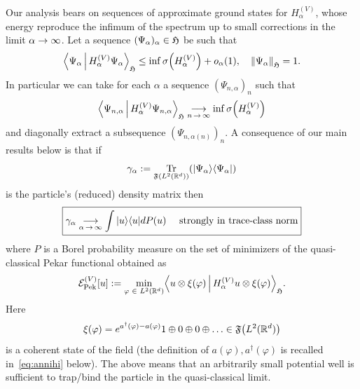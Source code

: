 \documentclass[10pt]{amsart}
\theoremstyle{definition}\newtheorem{defi}[theo]{Definition}\newtheorem{rema}[theo]{Remark}\newtheorem{exam}[theo]{Example}\newtheorem{exem}[theo]{Example}\newtheorem{nota}[theo]{Notation}
\DeclareMathOperator{\Tr}{Tr}
\newcommand{\R}{\mathbb{R}}
\newcommand{\gH}{\mathfrak{H}}
\newcommand{\gF}{\mathfrak{F}}
\newcommand{\cE}{\mathcal{E}}
\newcommand{\1}{\mathds{1}}
\newcommand{\cEP}{\cE_{\mathrm{Pek}}}
\let\oldin\in
\renewcommand{\in}{\mathchoice{\oldin}{\oldin}{\,\oldin\,}{\,\oldin\,}}
\renewcommand*{\to}{\mathchoice{\longrightarrow}{\rightarrow}{\rightarrow}{\rightarrow}}
\let\originalleft\left
\let\originalright\right
\renewcommand{\left}{\mathopen{}\mathclose\bgroup\originalleft}
\renewcommand{\right}{\aftergroup\egroup\originalright}
\begin{document}
Our analysis bears on sequences of approximate ground states for $H_\alpha^{(V)}$, whose energy reproduce the infimum of the spectrum up to small corrections in the limit $\alpha \to \infty$. Let a sequence $(\Psi_\alpha)_\alpha \in \gH$ be such that
\begin{equation}\label{eq:approx GS}
\left\langle \Psi_\alpha\, \middle|\, H_\alpha^{(V)} \Psi_\alpha\right\rangle_{\gH} \leq \inf \sigma \left(H_\alpha^{(V)}\right) +o_{\alpha} (1), \quad \left\|\Psi_\alpha \right\|_\gH = 1.
\end{equation}
In particular we can take for each $\alpha$ a sequence $(\Psi_{n,\alpha})_n$ such that
\begin{equation*}
\left\langle \Psi_{n,\alpha} \, \middle|\, H_\alpha^{(V)} \Psi_{n,\alpha} \right\rangle_{\gH} \underset{n\,\to\,\infty}{\to} \inf \sigma\left(H_\alpha^{(V)}\right)
\end{equation*}
and diagonally extract a subsequence $(\Psi_{n,\alpha(n)})_n$. A consequence of our main results below is that if
\begin{equation}\label{eq:intro DM}
\gamma_\alpha := \Tr_{\gF(L^2 (\R^d))} \left(|\Psi_\alpha \rangle \langle \Psi_\alpha|\right)
\end{equation}
is the particle's (reduced) density matrix then
\begin{equation}\label{eq:intro main 1}
\boxed{\gamma_\alpha \underset{\alpha\,\to\,\infty}{\to} \int |u\rangle \langle u| dP (u) \quad\text{ strongly in trace-class norm}}
\end{equation}
where $P$ is a Borel probability measure on the set of minimizers of the quasi-classical Pekar functional obtained as
\begin{equation*}
\cEP^{(V)} [u] := \min_{\varphi \in L^2 (\R^d)} \left\langle u \otimes \xi (\varphi) \,\middle|\, H_\alpha^{(V)} u \otimes \xi (\varphi)\right\rangle_\gH.
\end{equation*}
Here
\begin{equation*}
\xi (\varphi) = e^{a^\dagger (\varphi) -a (\varphi) } 1 \oplus 0 \oplus 0 \oplus \ldots \in \gF \left(L^2 (\R^d)\right)
\end{equation*}
is a coherent state of the field (the definition of $a(\varphi),a^\dagger (\varphi)$ is recalled in~\eqref{eq:annihi} below). The above means that an arbitrarily small potential well is sufficient to trap/bind the particle in the quasi-classical limit.


\end{document}
